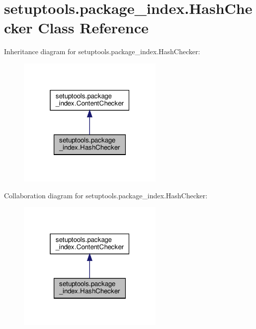 \hypertarget{classsetuptools_1_1package__index_1_1HashChecker}{}\section{setuptools.\+package\+\_\+index.\+Hash\+Checker Class Reference}
\label{classsetuptools_1_1package__index_1_1HashChecker}


Inheritance diagram for setuptools.\+package\+\_\+index.\+Hash\+Checker\+:
\nopagebreak
\begin{figure}[H]
\begin{center}
\leavevmode
\includegraphics[width=199pt]{classsetuptools_1_1package__index_1_1HashChecker__inherit__graph}
\end{center}
\end{figure}


Collaboration diagram for setuptools.\+package\+\_\+index.\+Hash\+Checker\+:
\nopagebreak
\begin{figure}[H]
\begin{center}
\leavevmode
\includegraphics[width=199pt]{classsetuptools_1_1package__index_1_1HashChecker__coll__graph}
\end{center}
\end{figure}
